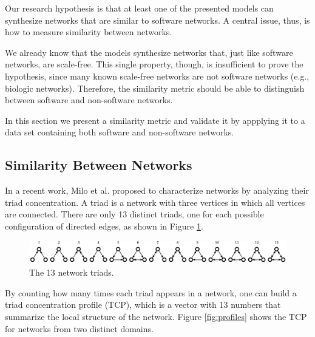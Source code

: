 Our research hypothesis is that at least one of the presented models can
synthesize networks that are similar to software networks. A central issue,
thus, is how to measure similarity between networks.

We already know that the models synthesize networks that, just like software
networks, are scale-free. This single property, though, is insufficient to prove
the hypothesis, since many known scale-free networks are not software networks
(e.g., biologic networks). Therefore, the similarity metric should be able to
distinguish between software and non-software networks.

In this section we present a similarity metric and validate it by appplying it
to a data set containing both software and non-software networks. 

\subsection{Similarity Between Networks}

In a recent work, Milo et al. \cite{Milo2002} proposed to characterize networks
by analyzing their triad concentration. A triad is a network with three vertices
in which all vertices are connected. There are only 13 distinct triads, one for
each possible configuration of directed edges, as shown in Figure
\ref{fig:triads}.

\begin{figure}[!t]
\centering
\includegraphics[width=1.0\textwidth]{triads}
\caption{The 13 network triads.}
\label{fig:triads}
\end{figure}

By counting how many times each triad appears in a network, one can build a
triad concentration profile (TCP), which is a vector with 13 numbers that
summarize the local structure of the network. Figure \ref{fig:profiles} shows
the TCP for networks from two distinct domains.

